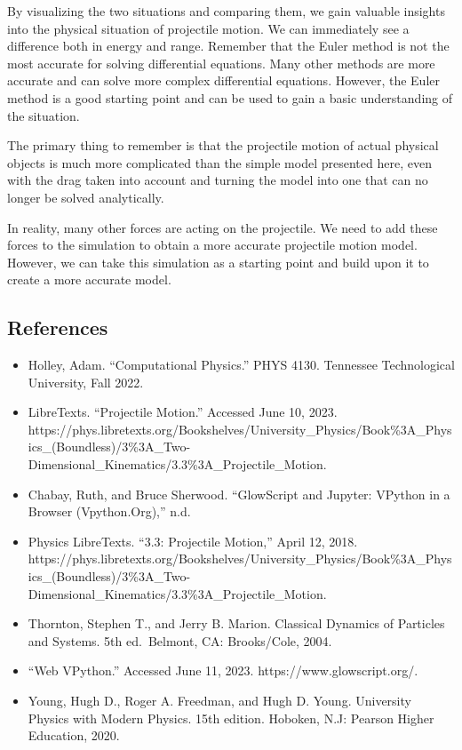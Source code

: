 \documentclass[11pt]{article}
\providecommand{\tightlist}{%
      \setlength{\itemsep}{0pt}\setlength{\parskip}{0pt}}
\begin{document}
By visualizing the two situations and comparing them, we gain valuable
insights into the physical situation of projectile motion. We can
immediately see a difference both in energy and range. Remember that the
Euler method is not the most accurate for solving differential
equations. Many other methods are more accurate and can solve more
complex differential equations. However, the Euler method is a good
starting point and can be used to gain a basic understanding of the
situation.

The primary thing to remember is that the projectile motion of actual
physical objects is much more complicated than the simple model
presented here, even with the drag taken into account and turning the
model into one that can no longer be solved analytically.

In reality, many other forces are acting on the projectile. We need to
add these forces to the simulation to obtain a more accurate projectile
motion model. However, we can take this simulation as a starting point
and build upon it to create a more accurate model.

    \hypertarget{references}{%
\subsection{References}\label{references}}

\begin{itemize}
\tightlist
\item
  Holley, Adam. ``Computational Physics.'' PHYS 4130. Tennessee
  Technological University, Fall 2022.
\item
  LibreTexts. ``Projectile Motion.'' Accessed June 10, 2023.
  https://phys.libretexts.org/Bookshelves/University\_Physics/Book\%3A\_Physics\_(Boundless)/3\%3A\_Two-Dimensional\_Kinematics/3.3\%3A\_Projectile\_Motion.
\item
  Chabay, Ruth, and Bruce Sherwood. ``GlowScript and Jupyter: VPython in
  a Browser (Vpython.Org),'' n.d.
\item
  Physics LibreTexts. ``3.3: Projectile Motion,'' April 12, 2018.
  https://phys.libretexts.org/Bookshelves/University\_Physics/Book\%3A\_Physics\_(Boundless)/3\%3A\_Two-Dimensional\_Kinematics/3.3\%3A\_Projectile\_Motion.
\item
  Thornton, Stephen T., and Jerry B. Marion. Classical Dynamics of
  Particles and Systems. 5th ed.~Belmont, CA: Brooks/Cole, 2004.
\item
  ``Web VPython.'' Accessed June 11, 2023. https://www.glowscript.org/.
\item
  Young, Hugh D., Roger A. Freedman, and Hugh D. Young. University
  Physics with Modern Physics. 15th edition. Hoboken, N.J: Pearson
  Higher Education, 2020.
\end{itemize}


    
    
    
\end{document}
